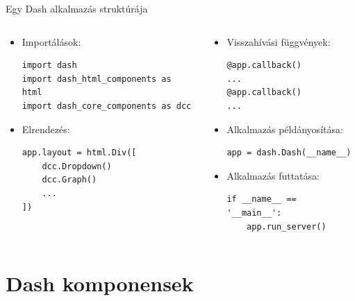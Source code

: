 \documentclass[english, aspectratio=169]{beamer}
\makeatletter
\let\origtableofcontents=\tableofcontents
\def\tableofcontents{\@ifnextchar[{\origtableofcontents}{\gobbletableofcontents}}
\def\gobbletableofcontents#1{\origtableofcontents}
\makeatother
\begin{document}
\begin{frame}[fragile]{Egy Dash alkalmazás struktúrája}
	\begin{columns}
		\begin{column}{.5\textwidth}
			\begin{itemize}
				\item Importálások:
					\begin{lstlisting}
import dash
import dash_html_components as html
import dash_core_components as dcc
					\end{lstlisting}
				\item Elrendezés:
					\begin{lstlisting}
app.layout = html.Div([
	dcc.Dropdown()
	dcc.Graph()
	...
])
					\end{lstlisting}
			\end{itemize}
		\end{column}
		\begin{column}{.5\textwidth}
			\begin{itemize}
				\item Visszahívási függvények:
					\begin{lstlisting}
@app.callback()
...
@app.callback()
...
					\end{lstlisting}
				\item Alkalmazás példányosítása:
					\begin{lstlisting}
app = dash.Dash(__name__)
					\end{lstlisting}
				\item Alkalmazás futtatása:
					\begin{lstlisting}
if __name__ == '__main__':
	app.run_server()
					\end{lstlisting}
			\end{itemize}
		\end{column}
	\end{columns}
\end{frame}

\section{Dash komponensek}

\begin{frame}
	\tableofcontents[currentsection]
\end{frame}
\end{document}
